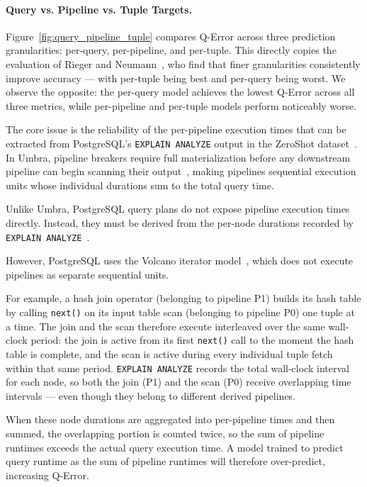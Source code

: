 \paragraph{Query vs. Pipeline vs. Tuple Targets.}

Figure~\ref{fig:query_pipeline_tuple} compares Q-Error across three prediction granularities:
per-query, per-pipeline, and per-tuple.
This directly copies the evaluation of Rieger and Neumann~\parencite{t3},
who find that finer granularities consistently improve accuracy —
with per-tuple being best and per-query being worst.
We observe the opposite: the per-query model achieves the lowest Q-Error across all three metrics,
while per-pipeline and per-tuple models perform noticeably worse.

The core issue is the reliability of the per-pipeline execution times
that can be extracted from PostgreSQL's \texttt{EXPLAIN ANALYZE} output in the ZeroShot dataset~\parencite{postgresql_docs_query_path}.
In Umbra, pipeline breakers require full materialization before any downstream pipeline
can begin scanning their output~\parencite{t3},
making pipelines sequential execution units
whose individual durations sum to the total query time.

Unlike Umbra, PostgreSQL query plans do not expose pipeline execution times directly.
Instead, they must be derived from the per-node durations recorded by
\texttt{EXPLAIN ANALYZE}~\parencite{postgresql_docs_query_path}.

However, PostgreSQL uses the Volcano iterator model~\parencite{graefe1994},
which does not execute pipelines as separate sequential units.

For example, a hash join operator (belonging to pipeline P1)
builds its hash table by calling \texttt{next()} on its input table scan (belonging to pipeline P0)
one tuple at a time.
The join and the scan therefore execute interleaved over the same wall-clock period:
the join is active from its first \texttt{next()} call to the moment the hash table is complete,
and the scan is active during every individual tuple fetch within that same period.
\texttt{EXPLAIN ANALYZE} records the total wall-clock interval for each node,
so both the join (P1) and the scan (P0) receive overlapping time intervals —
even though they belong to different derived pipelines.

When these node durations are aggregated into per-pipeline times and then summed,
the overlapping portion is counted twice,
so the sum of pipeline runtimes exceeds the actual query execution time.
A model trained to predict query runtime as the sum of pipeline runtimes
will therefore over-predict, increasing Q-Error.

